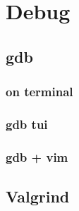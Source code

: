 \chapter{Debug} 

\section{gdb} 

\subsection{on terminal} 

\subsection{gdb tui} 

\subsection{gdb + vim} 

\section{Valgrind} 
